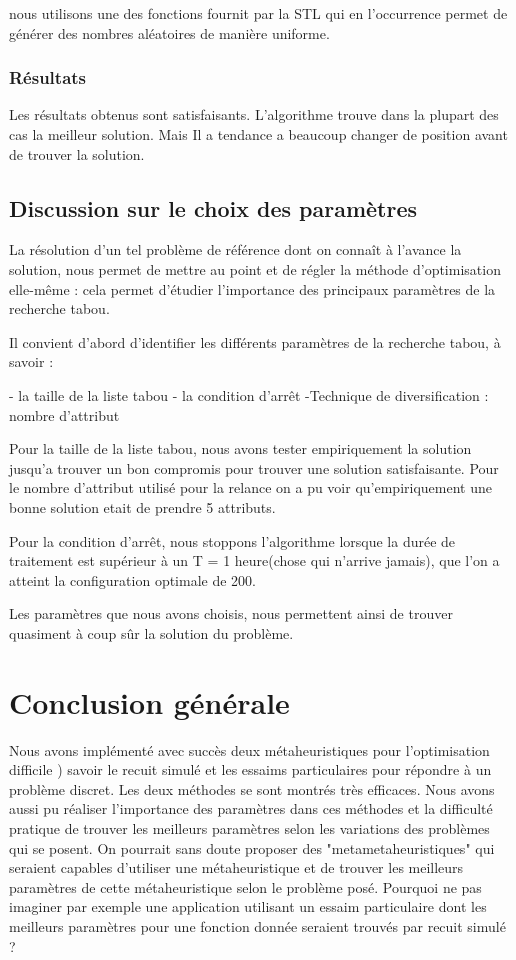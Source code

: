 \documentclass{report}
\begin{document}
 nous utilisons une des fonctions fournit par la STL qui en l’occurrence permet de générer des nombres aléatoires de manière uniforme.

\subsection{Résultats}
Les résultats obtenus sont satisfaisants. L'algorithme trouve dans la plupart des cas la meilleur solution. Mais Il a tendance a beaucoup changer de position avant de trouver la solution.


\section{Discussion sur le choix des paramètres}
La résolution d'un tel problème de référence dont on connaît à l'avance la solution, nous permet de mettre au point et de régler la méthode d'optimisation elle-même : cela permet d'étudier l'importance des principaux paramètres de la recherche tabou.

Il convient d'abord d'identifier les différents paramètres de la recherche tabou, à savoir :

- la taille de la liste tabou
- la condition d'arrêt
-Technique de diversification : nombre d'attribut

Pour la taille de la liste tabou, nous avons tester empiriquement la solution jusqu'a trouver un bon compromis pour trouver une solution satisfaisante. 
Pour le nombre d'attribut utilisé pour la relance on a pu voir qu'empiriquement une bonne solution etait de prendre 5 attributs.

Pour la condition d'arrêt, nous stoppons l'algorithme lorsque la durée de traitement est supérieur à un T = 1 heure(chose qui n'arrive jamais), que l'on a atteint la configuration optimale de 200.

Les paramètres que nous avons choisis, nous permettent ainsi de trouver quasiment à coup sûr la solution du problème.
\chapter{Conclusion générale}
Nous avons implémenté avec succès deux métaheuristiques pour l'optimisation difficile ) savoir le recuit simulé et les essaims particulaires pour répondre à un problème discret. Les deux méthodes se sont montrés très efficaces. Nous avons aussi pu réaliser l'importance des paramètres dans ces méthodes et la difficulté pratique de trouver les meilleurs paramètres selon les variations des problèmes qui se posent. On pourrait sans doute proposer des "metametaheuristiques" qui seraient capables d’utiliser une métaheuristique et de trouver
les meilleurs paramètres de cette métaheuristique selon le problème posé. Pourquoi
ne pas imaginer par exemple une application utilisant un essaim particulaire dont les
meilleurs paramètres pour une fonction donnée seraient trouvés par recuit simulé ?
\end{document}
